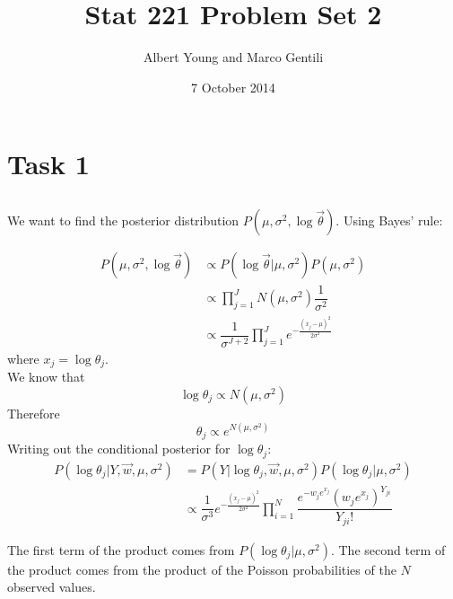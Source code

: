 \documentclass[10pt]{article}
\title{Stat 221 Problem Set 2}
\author{Albert Young and Marco Gentili}
\date{7 October 2014}
\begin{document}
\maketitle

\section{Task 1}
\subsection{}
We want to find the posterior distribution $P(\mu, \sigma^2, \log \vec{\theta})$. Using Bayes' rule:

\begin{equation}
\begin{split}
    P(\mu, \sigma^2, \log \vec{\theta}) &\propto P( \log \vec{\theta} | \mu, \sigma^2 ) P( \mu, \sigma^2 )\\
    &\propto \prod_{j=1}^J N(\mu, \sigma^2) \dfrac{1}{\sigma^2}\\
    &\propto \dfrac{1}{\sigma^{J+2}}\prod_{j=1}^J e^{-\frac{(x_j-\mu)^2}{2\sigma^2}}
    \end{split}
\end{equation}
where $x_j = \log\theta_j$.\\

We know that
\begin{equation}
\log \theta_j \propto N(\mu, \sigma^2)
\end{equation}
Therefore
\begin{equation}
\theta_j \propto e^{N( \mu, \sigma^2 )}
\end{equation}
 Writing out the conditional posterior for $\log \theta_j$:
\begin{equation}
\begin{split}
    P(\log \theta_j | Y, \vec{w}, \mu, \sigma^2 )&=    P( Y | \log \theta_j, \vec{w}, \mu, \sigma^2 ) P( \log \theta_j | \mu, \sigma^2 )\\
    &\propto \dfrac{1}{\sigma^3}
    e^{-\frac{(x_j-\mu)^2}{2\sigma^2}} \prod_{i = 1}^N \dfrac{e^{-w_je^{x_j}}(w_je^{x_j})^{Y_{ji}}}{Y_{ji}!}
\end{split}
\end{equation}

The first term of the product comes from $P(\log \theta_j | \mu, \sigma^2)$. The second term of the product comes from the product of the Poisson probabilities of the $N$ observed values.\\
\end{document}
